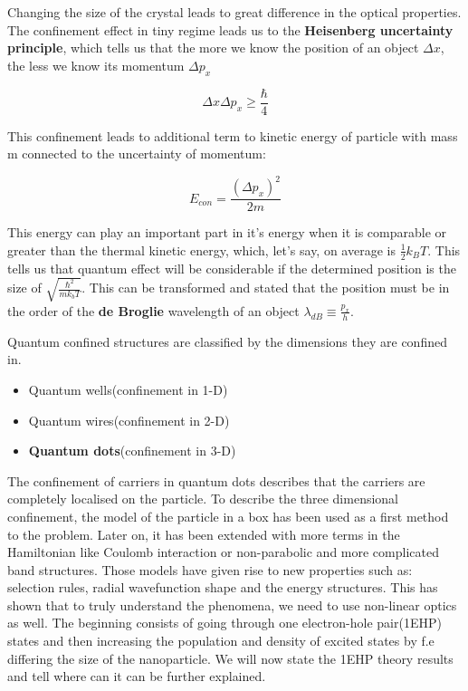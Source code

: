 Changing the size of the crystal leads to great difference in the optical properties. The confinement effect in tiny regime leads us to the \textbf{Heisenberg uncertainty principle}, which tells us that the more we know the position of an object $\Delta x$, the less we know its momentum $\Delta p_x$

\begin{equation}
\Delta x \Delta p_x \geq \frac{\hbar}{4}
\end{equation}

This confinement leads to additional term to kinetic energy of particle with mass m connected to the uncertainty of momentum:

\begin{equation}
E_{con} = \frac{(\Delta p_x)^2}{2m}
\end{equation}

This energy can play an important part in it's energy when it is comparable or greater than the thermal kinetic energy, which, let's say, on average is $\frac{1}{2}k_BT$.
This tells us that quantum effect will be considerable if the determined position is the size of $\sqrt{\frac{\hbar ^2}{mk_bT}}$. This can be transformed and stated that the position must be in the order of the \textbf{de Broglie} wavelength of an object $\lambda_{dB} \equiv \frac{p_x}{h}$.

Quantum confined structures are classified by the dimensions they are confined in.

\begin{itemize}
\item Quantum wells(confinement in 1-D)
\item Quantum wires(confinement in 2-D)
\item \textbf{Quantum dots}(confinement in 3-D)
\end{itemize}

The confinement of carriers in quantum dots describes that the carriers are completely localised on the particle. To describe the three dimensional confinement, the model of the particle in a box has been used as a first method to the problem. Later on, it has been extended with more terms in the Hamiltonian like Coulomb interaction or non-parabolic and more complicated band structures. Those models have given rise to new properties such as: selection rules, radial wavefunction shape and the energy structures. This has shown that to truly understand the phenomena, we need to use non-linear optics as well. The beginning consists of going through one electron-hole pair(1EHP) states and then increasing the population and density of excited states by f.e differing the size of the nanoparticle. We will now state the 1EHP theory results and tell where can it can be further explained. 

